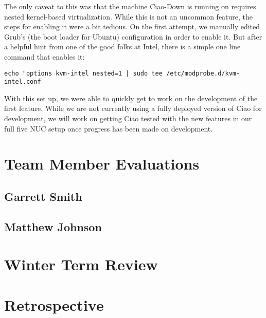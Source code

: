 \documentclass[10pt,onecolumn,journal,draftclsnofoot]{IEEEtran}
\begin{document}
The only caveat to this was that the machine Ciao-Down is running on requires
nested kernel-based virtualization. While this is not an uncommon feature, the
steps for enabling it were a bit tedious. On the first attempt, we manually
edited Grub's (the boot loader for Ubuntu) configuration in order to enable it.
But after a helpful hint from one of the good folks at Intel, there is a simple
one line command that enables it:

\begin{lstlisting}[caption = An easy way to enable nested KVM support]
	echo "options kvm-intel nested=1 | sudo tee /etc/modprobe.d/kvm-intel.conf
\end{lstlisting}

With this set up, we were
able to quickly get to work on the development of the first feature. While we
are not currently using a fully deployed version of Ciao for development, we
will work on getting Ciao tested with the new features in our full five NUC
setup once progress has been made on development.

\section{Team Member Evaluations}
\subsection{Garrett Smith}
\subsection{Matthew Johnson}

\section{Winter Term Review}

\section{Retrospective}
\end{document}
